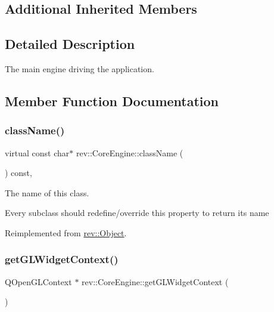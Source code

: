 \subsection*{Additional Inherited Members}


\subsection{Detailed Description}
The main engine driving the application. 

\subsection{Member Function Documentation}
\mbox{\label{classrev_1_1_core_engine_a2ae64bfe54f092fe37b4415ca56df1b5}} 
\subsubsection{\texorpdfstring{className()}{className()}}
{\footnotesize\ttfamily virtual const char$\ast$ rev\+::\+Core\+Engine\+::class\+Name (\begin{DoxyParamCaption}{ }\end{DoxyParamCaption}) const\hspace{0.3cm}{\ttfamily [inline]}, {\ttfamily [virtual]}}



The name of this class. 

Every subclass should redefine/override this property to return its name 

Reimplemented from \mbox{\hyperlink{classrev_1_1_object_a7a2013f91169479b65cf93afdc5d9a68}{rev\+::\+Object}}.

\mbox{\label{classrev_1_1_core_engine_a8963c3b3c0ef876d3ba0ba2d79714f87}} 
\subsubsection{\texorpdfstring{getGLWidgetContext()}{getGLWidgetContext()}}
{\footnotesize\ttfamily Q\+Open\+G\+L\+Context $\ast$ rev\+::\+Core\+Engine\+::get\+G\+L\+Widget\+Context (\begin{DoxyParamCaption}{ }\end{DoxyParamCaption})}



